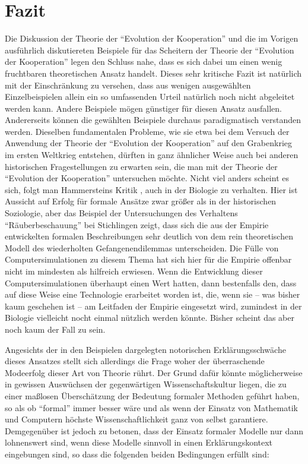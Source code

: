 \documentclass[12pt,a4paper,ngerman]{article}
\begin{document}

\section{Fazit}

Die Diskussion der Theorie der "`Evolution der Kooperation"' und die im
Vorigen ausführlich diskutiereten Beispiele für das Scheitern der Theorie der
"`Evolution der Kooperation"' legen den Schluss nahe, dass es sich dabei um
einen wenig fruchtbaren theoretischen Ansatz handelt.  Dieses sehr kritische
Fazit ist natürlich mit der Einschränkung zu versehen, dass aus wenigen
ausgewählten Einzelbeispielen allein ein so umfassenden Urteil natürlich noch
nicht abgeleitet werden kann. Andere Beispiele mögen günstiger für diesen
Ansatz ausfallen. Andererseits können die gewählten Beispiele durchaus
paradigmatisch verstanden werden. Dieselben fundamentalen Probleme, wie sie
etwa bei dem Versuch der Anwendung der Theorie der "`Evolution der
Kooperation"' auf den Grabenkrieg im ersten Weltkrieg entstehen, dürften in
ganz ähnlicher Weise auch bei anderen historischen Fragestellungen zu erwarten
sein, die man mit der Theorie der "`Evolution der Kooperation"' untersuchen
möchte.  Nicht viel anders scheint es sich, folgt man Hammersteins Kritik
\cite{hammerstein:2003a}, auch in der Biologie zu verhalten.  Hier ist
Aussicht auf Erfolg für formale Ansätze zwar größer als in der historischen
Soziologie, aber das Beispiel der Untersuchungen des Verhaltens
"`Räuberbeschauung"' bei Stichlingen \cite{milinski-parker:1997} zeigt, dass
sich die aus der Empirie entwickelten formalen Beschreibungen sehr deutlich
von dem rein theoretischen Modell des wiederholten Gefangenendilemmas
unterscheiden. Die Fülle von Computersimulationen zu diesem Thema hat sich
hier für die Empirie offenbar nicht im mindesten als hilfreich erwiesen. Wenn
die Entwicklung dieser Computersimulationen überhaupt einen Wert hatten, dann
bestenfalls den, dass auf diese Weise eine Technologie erarbeitet worden ist,
die, wenn sie -- was bisher kaum geschehen ist -- am Leitfaden der Empirie
eingesetzt wird, zumindest in der Biologie vielleicht nocht einmal nützlich
werden könnte. Bisher scheint das aber noch kaum der Fall zu sein.

Angesichts der in den Beispielen dargelegten notorischen
Erklärungsschwäche dieses Ansatzes stellt sich allerdings die Frage
woher der überraschende Modeerfolg dieser Art von Theorie rührt. Der
Grund dafür könnte möglicherweise in gewissen Auswüchsen der
gegenwärtigen Wissenschaftskultur liegen, die zu einer maßlosen
Überschätzung der Bedeutung formaler Methoden geführt haben, so als ob
"`formal"' immer besser wäre und als wenn der Einsatz von Mathematik
und Computern höchste Wissenschaftlichkeit ganz von selbst garantiere.
Demgegenüber ist jedoch zu betonen, dass der Einsatz formaler Modelle
nur dann lohnenswert sind, wenn diese Modelle sinnvoll in einen
Erklärungskontext eingebungen sind, so dass die folgenden beiden
Bedingungen erfüllt sind:
\end{document}
